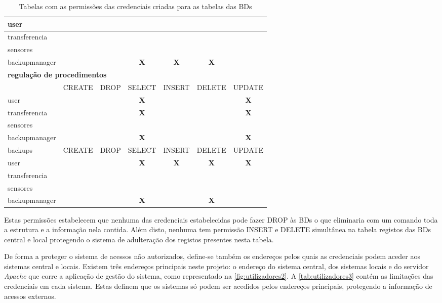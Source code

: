 \documentclass[11pt,twoside,a4paper]{report}
\begin{document}
\begin{table}
\begin{tabular}{|l|c|c|c|c|c|c|}
		user & & & & & & \\ \hline
		transferencia & & & & & & \\ \hline
		sensores & & & & & & \\ \hline
		backupmanager & & & \textbf{X} & \textbf{X} & \textbf{X} & \\ \hline
		\multicolumn{7}{l}{\textbf{regulação de procedimentos}} \\ \hline
		\makecell{atualizar} & CREATE & DROP & SELECT & INSERT & DELETE & UPDATE \\ \hline
		user & & & \textbf{X} & & & \textbf{X} \\ \hline
		transferencia & & & \textbf{X} & & & \textbf{X} \\ \hline
		sensores & & & & & & \\ \hline
		backupmanager & & & \textbf{X} & & & \textbf{X} \\ \hline
		backups & CREATE & DROP & SELECT & INSERT & DELETE & UPDATE \\ \hline
		user & & & \textbf{X} & \textbf{X} & \textbf{X} & \textbf{X} \\ \hline
		transferencia & & & & & & \\ \hline
		sensores & & & & & & \\ \hline
		backupmanager & & & \textbf{X} & & \textbf{X} & \\ \hline
	\end{tabular}
	\caption[Tabelas com as permissões das credenciais criadas para as tabelas das bases de dados]{Tabelas com as permissões das credenciais criadas para as tabelas das BDs}
	\label{tab:utilizadores1}
\end{table}
Estas permissões estabelecem que nenhuma das credenciais estabelecidas pode fazer DROP às BDs o que eliminaria com um comando toda a estrutura e a informação nela contida. Além disto, nenhuma tem permissão INSERT e DELETE simultânea na tabela registos das BDs central e local protegendo o sistema de adulteração dos registos presentes nesta tabela.\par 
De forma a proteger o sistema de acessos não autorizados, define-se também os endereços pelos quais as credenciais podem aceder aos sistemas central e locais. Existem três endereços principais neste projeto: o endereço do sistema central, dos sistemas locais e do servidor \textit{Apache} que corre a aplicação de gestão do sistema, como representado na \autoref{fig:utilizadores2}. A \autoref{tab:utilizadores3} contém as limitações das credenciais em cada sistema. Estas definem que os sistemas só podem ser acedidos pelos endereços principais, protegendo a informação de acessos externos.
\end{document}
